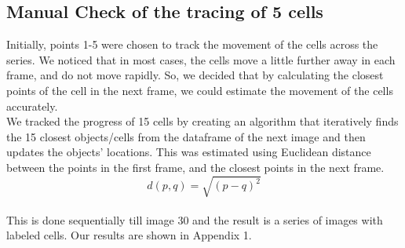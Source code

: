 \documentclass{article}
\begin{document}
\subsection*{Manual Check of the tracing of 5 cells}
Initially, points 1-5 were chosen to track the movement of the cells across the series. We noticed that in most cases, the cells move a little further away in each frame, and do not move rapidly. So, we decided that by calculating the closest points of the cell in the next frame, we could estimate the movement of the cells accurately. 
~\\We tracked the progress of 15 cells by creating an algorithm that iteratively finds the 15 closest objects/cells from the dataframe of the next image and then updates the objects' locations. This was estimated using Euclidean distance between the points in the first frame, and the closest points in the next frame. 
\begin{equation*}
    \displaystyle d(p,q)={\sqrt {(p-q)^{2}}}
\end{equation*}
~\\This is done sequentially till image 30 and the result is a series of images with labeled cells. Our results are shown in Appendix 1. 
\end{document}
